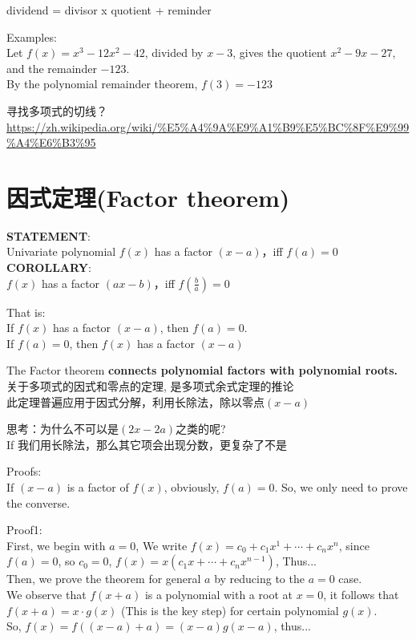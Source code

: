 \documentclass[../main.tex]{subfiles}
\begin{document}
dividend = divisor x quotient + reminder

Examples:\\
Let $f(x)=x^3-12x^2-42$, divided by $x-3$, gives the quotient $x^2-9x-27$, and the remainder $-123$.\\
By the polynomial remainder theorem, $f(3)=-123$

寻找多项式的切线？  \url{https://zh.wikipedia.org/wiki/%E5%A4%9A%E9%A1%B9%E5%BC%8F%E9%99%A4%E6%B3%95}

\section{因式定理(Factor theorem)}
\begin{mdframed}
  \textbf{STATEMENT}:\\
  Univariate polynomial $f(x)$ has a factor $(x-a)$，iff $f(a)=0$\\
  \textbf{COROLLARY}:\\
  $f(x)$ has a factor $(ax-b)$，iff $f(\frac{b}{a})=0$
\end{mdframed}
That is:\\
If $f(x)$ has a factor $(x-a)$, then $f(a)=0$. \\
If $f(a)=0$, then $f(x)$ has a factor $(x-a)$

The Factor theorem \textbf{connects polynomial factors with polynomial roots.}\\
关于多项式的因式和零点的定理, 是多项式余式定理的推论\\
此定理普遍应用于因式分解，利用长除法，除以零点$(x-a)$

思考：为什么不可以是$(2x-2a)$之类的呢?\\
If 我们用长除法，那么其它项会出现分数，更复杂了不是

Proofs:\\
If $(x-a)$ is a factor of $f(x)$, obviously, $f(a)=0$. So, we only need to prove the converse.

Proof1:\\
First, we begin with $a=0$, We write $f(x)=c_0+c_1x^1+\cdots +c_nx^n$, since $f(a)=0$, so $c_0=0$, $f(x)=x(c_1x+\cdots +c_nx^{n-1})$, Thus... \\
Then, we prove the theorem for general $a$ by reducing to the $a=0$ case.\\
We observe that $f(x+a)$ is a polynomial with a root at $x=0$, it follows that $f(x+a)=x\cdot g(x)$ (This is the key step) for certain polynomial $g(x)$.\\
So, $f(x)=f((x-a)+a)=(x-a)g(x-a)$,  thus...
\end{document}
